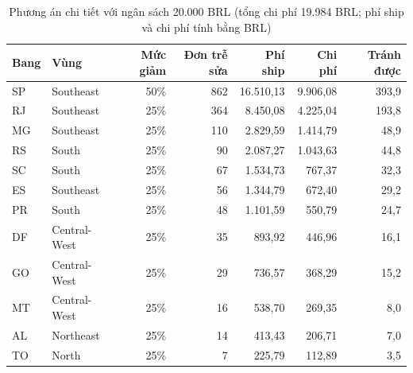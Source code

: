 \documentclass[12pt,a4paper]{report}
\renewcommand{\_}{\oldunderscore\allowbreak}
\begin{document}
\begin{table}[H]
\centering\small
\caption{Phương án chi tiết với ngân sách 20.000 BRL (tổng chi phí 19.984 BRL; phí ship và chi phí tính bằng BRL)}
\begin{tabular}{llrrrrr}
\toprule
Bang & Vùng & Mức giảm & Đơn trễ sửa & Phí ship & Chi phí & Tránh được \\
\midrule
SP & Southeast & 50\% & 862 & 16.510,13 & 9.906,08 & 393,9 \\
RJ & Southeast & 25\% & 364 & 8.450,08 & 4.225,04 & 193,8 \\
MG & Southeast & 25\% & 110 & 2.829,59 & 1.414,79 & 48,9 \\
RS & South & 25\% & 90 & 2.087,27 & 1.043,63 & 44,8 \\
SC & South & 25\% & 67 & 1.534,73 & 767,37 & 32,3 \\
ES & Southeast & 25\% & 56 & 1.344,79 & 672,40 & 29,2 \\
PR & South & 25\% & 48 & 1.101,59 & 550,79 & 24,7 \\
DF & Central-West & 25\% & 35 & 893,92 & 446,96 & 16,1 \\
GO & Central-West & 25\% & 29 & 736,57 & 368,29 & 15,2 \\
MT & Central-West & 25\% & 16 & 538,70 & 269,35 & 8,0 \\
AL & Northeast & 25\% & 14 & 413,43 & 206,71 & 7,0 \\
TO & North & 25\% & 7 & 225,79 & 112,89 & 3,5 \\
\bottomrule
\end{tabular}
\end{table}
\end{document}
